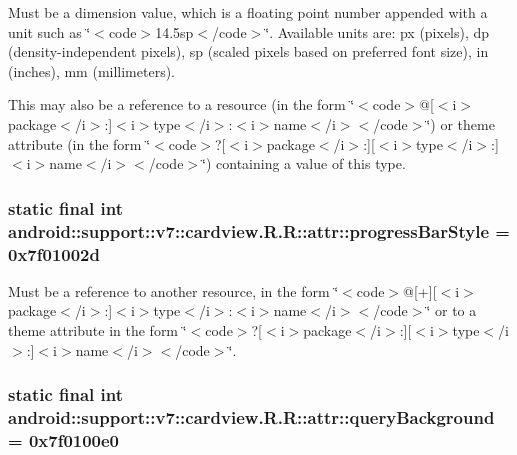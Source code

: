 Must be a dimension value, which is a floating point number appended with a unit such as \char`\"{}$<$code$>$14.5sp$<$/code$>$\char`\"{}. Available units are: px (pixels), dp (density-independent pixels), sp (scaled pixels based on preferred font size), in (inches), mm (millimeters). 

This may also be a reference to a resource (in the form \char`\"{}$<$code$>$@\mbox{[}$<$i$>$package$<$/i$>$:\mbox{]}$<$i$>$type$<$/i$>$:$<$i$>$name$<$/i$>$$<$/code$>$\char`\"{}) or theme attribute (in the form \char`\"{}$<$code$>$?\mbox{[}$<$i$>$package$<$/i$>$:\mbox{]}\mbox{[}$<$i$>$type$<$/i$>$:\mbox{]}$<$i$>$name$<$/i$>$$<$/code$>$\char`\"{}) containing a value of this type. \hypertarget{classandroid_1_1support_1_1v7_1_1cardview_1_1_r_1_1attr_1fa5d98abe681f9647b609a95891d0ad}{
\subsubsection[{progressBarStyle}]{\setlength{\rightskip}{0pt plus 5cm}static final int android::support::v7::cardview.R.R::attr::progressBarStyle = 0x7f01002d}}
\label{classandroid_1_1support_1_1v7_1_1cardview_1_1_r_1_1attr_1fa5d98abe681f9647b609a95891d0ad}


Must be a reference to another resource, in the form \char`\"{}$<$code$>$@\mbox{[}+\mbox{]}\mbox{[}$<$i$>$package$<$/i$>$:\mbox{]}$<$i$>$type$<$/i$>$:$<$i$>$name$<$/i$>$$<$/code$>$\char`\"{} or to a theme attribute in the form \char`\"{}$<$code$>$?\mbox{[}$<$i$>$package$<$/i$>$:\mbox{]}\mbox{[}$<$i$>$type$<$/i$>$:\mbox{]}$<$i$>$name$<$/i$>$$<$/code$>$\char`\"{}. \hypertarget{classandroid_1_1support_1_1v7_1_1cardview_1_1_r_1_1attr_a60e0289e17d48f4c11297bdd3af996a}{
\subsubsection[{queryBackground}]{\setlength{\rightskip}{0pt plus 5cm}static final int android::support::v7::cardview.R.R::attr::queryBackground = 0x7f0100e0}}
\label{classandroid_1_1support_1_1v7_1_1cardview_1_1_r_1_1attr_a60e0289e17d48f4c11297bdd3af996a}


